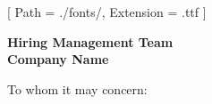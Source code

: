 


\renewcommand{\photo}[2]{}

\geometry{
  left=2cm,
  right=2cm,
  top=2cm,
  bottom=2cm
}



\makecvheader

\setmainfont{NotoSans-Regular}[
  Path = ./fonts/,
  Extension = .ttf
]

\vspace{1cm}
\indent\textbf{Hiring Management Team}\\
\indent\textbf{Company Name}

\vspace{0.5cm}

\noindent To whom it may concern:

\vspace{0.5cm}

